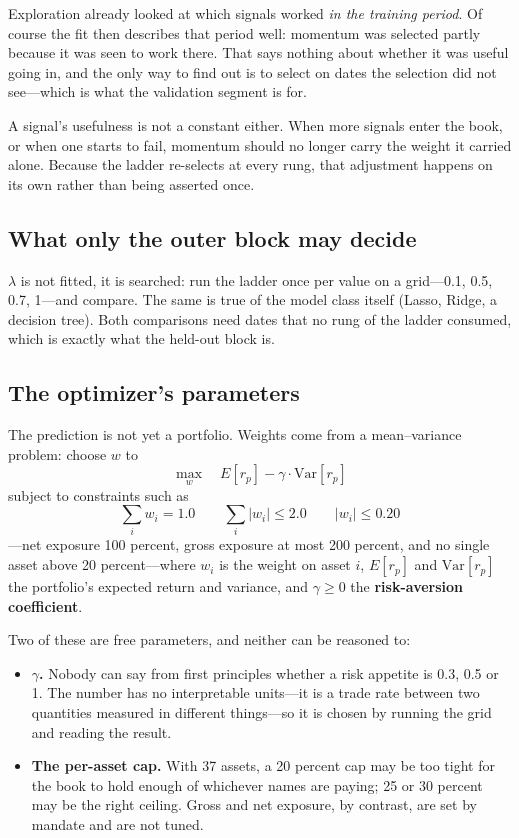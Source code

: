 Exploration already looked at which signals worked \emph{in the training period}. Of course the
fit then describes that period well: momentum was selected partly because it was seen to work
there. That says nothing about whether it was useful going in, and the only way to find out is to
select on dates the selection did not see---which is what the validation segment is for.

\begin{note}
A signal's usefulness is not a constant either. When more signals enter the book, or when one
starts to fail, momentum should no longer carry the weight it carried alone. Because the ladder
re-selects at every rung, that adjustment happens on its own rather than being asserted once.
\end{note}

\subsection{What only the outer block may decide}\label{sec:outer}

$\lambda$ is not fitted, it is searched: run the ladder once per value on a grid---0.1, 0.5, 0.7,
1---and compare. The same is true of the model class itself (Lasso, Ridge, a decision tree). Both
comparisons need dates that no rung of the ladder consumed, which is exactly what the held-out
block is.

\subsection{The optimizer's parameters}\label{sec:optimizer}

The prediction is not yet a portfolio. Weights come from a mean--variance problem: choose $w$ to
\[
  \max_w \quad E[r_p] - \gamma \cdot \mathrm{Var}[r_p]
\]
subject to constraints such as
\[
  \sum_i w_i = 1.0 \qquad \sum_i \left| w_i \right| \leq 2.0 \qquad \left| w_i \right| \leq 0.20
\]
---net exposure 100 percent, gross exposure at most 200 percent, and no single asset above 20
percent---where $w_i$ is the weight on asset $i$, $E[r_p]$ and $\mathrm{Var}[r_p]$ the portfolio's
expected return and variance, and $\gamma \geq 0$ the \textbf{risk-aversion coefficient}.

Two of these are free parameters, and neither can be reasoned to:

\begin{itemize}
  \item \textbf{$\gamma$.} Nobody can say from first principles whether a risk appetite is 0.3,
        0.5 or 1. The number has no interpretable units---it is a trade rate between two
        quantities measured in different things---so it is chosen by running the grid and reading
        the result.
  \item \textbf{The per-asset cap.} With 37 assets, a 20 percent cap may be too tight for the book
        to hold enough of whichever names are paying; 25 or 30 percent may be the right ceiling.
        Gross and net exposure, by contrast, are set by mandate and are not tuned.
\end{itemize}

